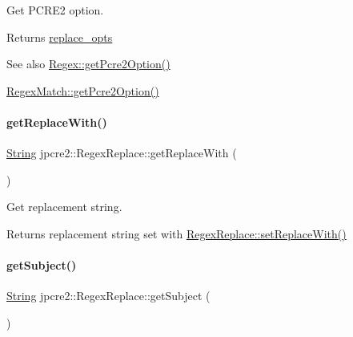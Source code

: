 Get P\+C\+R\+E2 option. 

\begin{DoxyReturn}{Returns}
\hyperlink{classjpcre2_1_1RegexReplace_afc79699cfcad8b7cbb26864b6b67cdc7}{replace\+\_\+opts} 
\end{DoxyReturn}
\begin{DoxySeeAlso}{See also}
\hyperlink{classjpcre2_1_1Regex_a857307fc59ba7f010b097e61c1744923_a857307fc59ba7f010b097e61c1744923}{Regex\+::get\+Pcre2\+Option()} 

\hyperlink{classjpcre2_1_1RegexMatch_a3e6e04f48cd5ee3fb9705214f746f343_a3e6e04f48cd5ee3fb9705214f746f343}{Regex\+Match\+::get\+Pcre2\+Option()} 
\end{DoxySeeAlso}
\hypertarget{classjpcre2_1_1RegexReplace_a7376993ef78e78950a44780417987640_a7376993ef78e78950a44780417987640}{}\label{classjpcre2_1_1RegexReplace_a7376993ef78e78950a44780417987640_a7376993ef78e78950a44780417987640} 
\paragraph{\texorpdfstring{get\+Replace\+With()}{getReplaceWith()}}
{\footnotesize\ttfamily \hyperlink{namespacejpcre2_a91f03070152fb228bc116c5a737f1d16}{String} jpcre2\+::\+Regex\+Replace\+::get\+Replace\+With (\begin{DoxyParamCaption}{ }\end{DoxyParamCaption})\hspace{0.3cm}{\ttfamily [inline]}}



Get replacement string. 

\begin{DoxyReturn}{Returns}
replacement string set with \hyperlink{classjpcre2_1_1RegexReplace_af1069f489de9b343493da2dc77b04c73_af1069f489de9b343493da2dc77b04c73}{Regex\+Replace\+::set\+Replace\+With()} 
\end{DoxyReturn}
\hypertarget{classjpcre2_1_1RegexReplace_a747ec0bd529b8dd49d2db30c75786026_a747ec0bd529b8dd49d2db30c75786026}{}\label{classjpcre2_1_1RegexReplace_a747ec0bd529b8dd49d2db30c75786026_a747ec0bd529b8dd49d2db30c75786026} 
\paragraph{\texorpdfstring{get\+Subject()}{getSubject()}}
{\footnotesize\ttfamily \hyperlink{namespacejpcre2_a91f03070152fb228bc116c5a737f1d16}{String} jpcre2\+::\+Regex\+Replace\+::get\+Subject (\begin{DoxyParamCaption}{ }\end{DoxyParamCaption})\hspace{0.3cm}{\ttfamily [inline]}}



